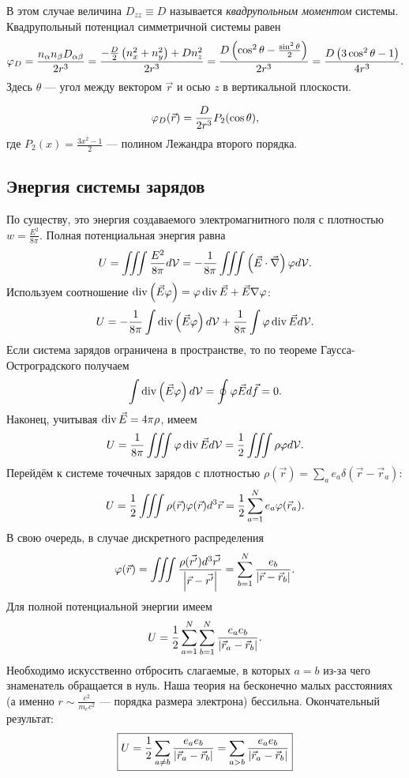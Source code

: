     В этом случае величина $D_{zz} \equiv D$ называется \textit{квадрупольным моментом} системы. Квадрупольный потенциал симметричной системы равен
    \begin{gather*}
        \varphi_D = \frac{n_{\alpha}n_{\beta}D_{\alpha\beta}}{2r^3} = \frac{-\frac D2 \left({n_x^2 + n_y^2}\right) + Dn_z^2}{2r^3} =
        \frac{D\left({\cos^2\theta - \frac{\sin^2\theta}{2}}\right)}{2r^3} = \frac{D\left({3\cos^2\theta - 1}\right)}{4r^3}.
    \end{gather*}
    Здесь $\theta$ --- угол между вектором $\vec{r}$ и осью $z$ в вертикальной плоскости.
    \begin{note}
        \[
            \varphi_D(\vec{r}) = \frac{D}{2r^3}P_2(\cos\theta),
        \]
        где $\displaystyle P_2(x) = \frac{3x^2 - 1}2$ --- полином Лежандра второго порядка.
    \end{note}

\subsection{Энергия системы зарядов}
    По существу, это энергия создаваемого электромагнитного поля с плотностью $w = \frac{E^2}{8\pi}$. Полная потенциальная энергия равна
    \[
        U = \iiint \frac{E^2}{8\pi}d\mathcal{V} = -\frac{1}{8\pi} \iiint \left({\vec{E}\cdot\vec{\nabla}}\right)\varphi d\mathcal{V}.
    \]
    Используем соотношение $\operatorname{div}\left({\vec{E}\varphi}\right) = \varphi\operatorname{div}\vec{E} + \vec{E}\nabla\varphi$:
    \[
        U = -\frac{1}{8\pi}\int\operatorname{div}\left({\vec{E}\varphi}\right) d\mathcal{V} + \frac{1}{8\pi}\int\varphi\operatorname{div}\vec{E}d\mathcal{V}.
    \]
    Если система зарядов ограничена в пространстве, то по теореме Гаусса-Остроградского получаем
    \[
        \int \operatorname{div}\left({\vec{E}\varphi}\right) d\mathcal{V} = \oint \varphi\vec{E}d\vec{f} = 0.
    \]
    Наконец, учитывая $\operatorname{div}\vec{E} = 4\pi\rho$, имеем
    \[
        U = \frac{1}{8\pi}\iiint\varphi\operatorname{div}\vec{E}d\mathcal{V} = \frac 12 \iiint \rho\varphi d\mathcal{V}.
    \]
    Перейдём к системе точечных зарядов с плотностью $\rho(\vec{r}) = \sum_ae_a\delta(\vec{r} - \vec{r}_a)$:
    \[
        U = \frac 12 \iiint \rho(\vec{r})\varphi(\vec{r})d^3\vec{r} = \frac 12 \sum_{a=1}^Ne_a\varphi(\vec{r}_a).
    \]
    В свою очередь, в случае дискретного распределения
    \[
        \varphi(\vec{r}) = \iiint\frac{\rho(\vec{r'})d^3\vec{r'}}{\left|{\vec{r} - \vec{r'}}\right|} = \sum_{b=1}^N\frac{e_b}{\left|{\vec{r} - \vec{r}_b}\right|}.
    \]
    Для полной потенциальной энергии имеем
    \[
        U = \frac 12 \sum_{a=1}^N\sum_{b=1}^N\frac{e_ae_b}{\left|{\vec{r}_a - \vec{r}_b}\right|}.
    \]
    Необходимо искусственно отбросить слагаемые, в которых $a = b$ из-за чего знаменатель обращается в нуль. Наша теория на бесконечно малых расстояниях
    (а именно $r \sim \frac{e^2}{m_ec^2}$ --- порядка размера электрона) бессильна. Окончательный результат:
    \[
        \boxed{U = \frac 12 \sum_{a \not= b} \frac{e_ae_b}{\left|{\vec{r}_a - \vec{r}_b}\right|} = \sum_{a>b}\frac{e_ae_b}{\left|{\vec{r}_a - \vec{r}_b}\right|}}
    \]

